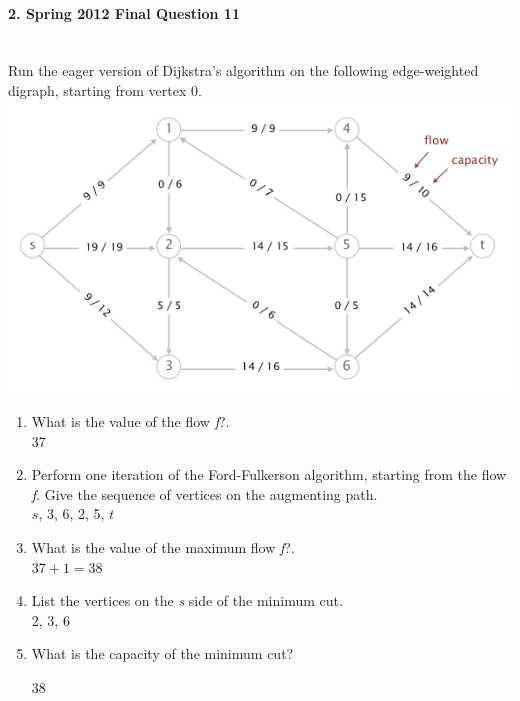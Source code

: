 \documentclass{article}
\begin{document}
\paragraph{\Large 2. Spring 2012 Final Question 11}\mbox{}\\
Run the eager version of Dijkstra’s algorithm on the following edge-weighted digraph, starting from vertex 0.\\
\includegraphics[]{fin-s12-11.png}
\begin{enumerate}
\renewcommand{\theenumi}{\Alph{enumi}}
	\item What is the value of the flow \textit{f}?.\\
	
	37

	\item Perform one iteration of the Ford-Fulkerson algorithm, starting from the flow \textit{f}. Give the sequence of vertices on the augmenting path.\\

	$s$, 3, 6, 2, 5, $t$  

	\item What is the value of the maximum flow \textit{f}?.\\
	
	$37+1=38$

	\item List the vertices on the \textit{s} side of the minimum cut.\\

	2, 3, 6

	\item What is the capacity of the minimum cut?

	38

\end{enumerate}
\end{document}
